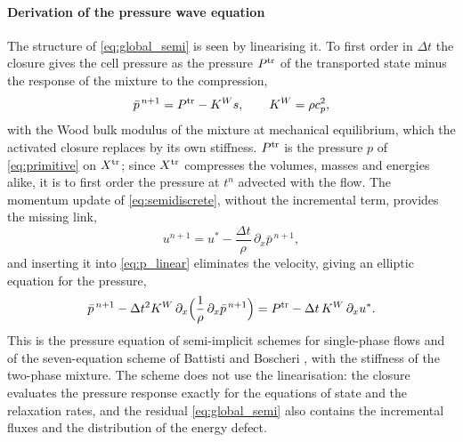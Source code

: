 \documentclass[a4paper,fleqn]{cas-sc}
\begin{document}
\paragraph{Derivation of the pressure wave equation}
The structure of \eqref{eq:global_semi} is seen by linearising it. To first order in $\Delta t$ the closure gives the cell
pressure as the pressure $P^{\rm tr}$ of the transported state minus the response of the mixture to the compression,
\begin{equation}
\bar p^{\,n+1}=P^{\rm tr}-K^W s,\qquad K^W=\rho c_p^2 ,
\label{eq:p_linear}
\end{equation}
with the Wood bulk modulus of the mixture at mechanical equilibrium, which the activated closure replaces by its own
stiffness. $P^{\rm tr}$ is the pressure $p$ of \eqref{eq:primitive} on $X^{\rm tr}$; since $X^{\rm tr}$ compresses the volumes,
masses and energies alike, it is to first order the pressure at $t^n$ advected with the flow. The momentum update of \eqref{eq:semidiscrete}, without the incremental term, provides the missing link,
\begin{equation}
u^{n+1}=u^*-\frac{\Delta t}{\rho}\,\partial_x\bar p^{\,n+1},
\label{eq:u_update}
\end{equation}
and inserting it into \eqref{eq:p_linear} eliminates the velocity, giving an elliptic equation for the pressure,
\begin{equation}
\bar p^{\,n+1}-\Delta t^2K^W\,\partial_x\Big(\frac1\rho\,\partial_x\bar p^{\,n+1}\Big)=P^{\rm tr}-\Delta t\,K^W\,\partial_xu^* .
\label{eq:wave}
\end{equation}
This is the pressure equation of semi-implicit schemes for single-phase flows \cite{DumbserCasulli2016,BoscheriPareschi2021} and of
the seven-equation scheme of Battisti and Boscheri \cite{BattistiBoscheri2025}, with the stiffness of the two-phase mixture. The scheme does not
use the linearisation: the closure evaluates the pressure response exactly for the equations of state and the relaxation
rates, and the residual \eqref{eq:global_semi} also contains the incremental fluxes and the distribution of the energy
defect.
\end{document}

